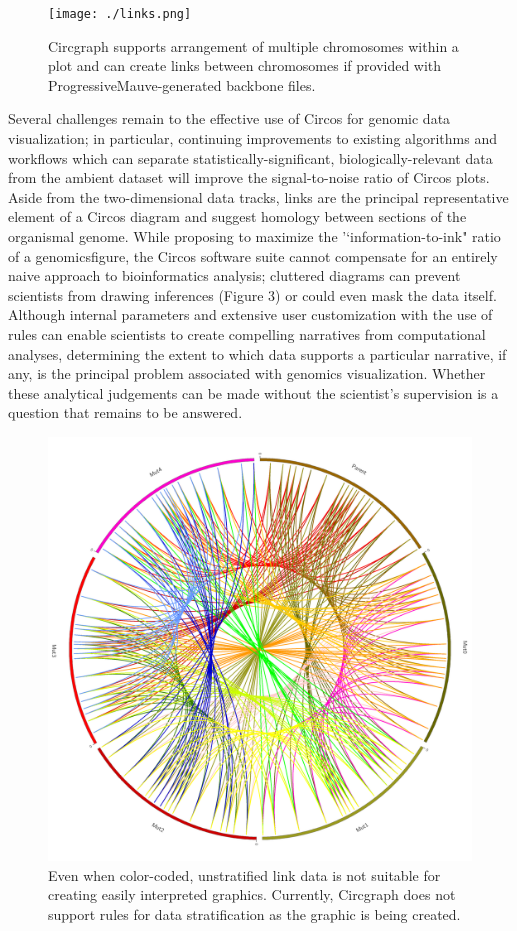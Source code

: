 \documentclass{article}
\begin{document}
\begin{figure}[H]
\centering
\texttt{[image: ./links.png]}
\caption{Circgraph supports arrangement of multiple chromosomes within a plot and can create links between chromosomes if provided with ProgressiveMauve-generated backbone files.}
\end{figure}

Several challenges remain to the effective use of Circos for genomic data visualization; in particular, continuing improvements to existing algorithms and workflows which can separate statistically-significant, biologically-relevant data from the ambient dataset will improve the signal-to-noise ratio of Circos plots. Aside from the two-dimensional data tracks, links are the principal representative element of a Circos diagram and suggest homology between sections of the organismal genome. While proposing to maximize the '`information-to-ink" ratio of a genomicsfigure, the Circos software suite cannot compensate for an entirely naive approach to bioinformatics analysis; cluttered diagrams can prevent scientists from drawing inferences (Figure 3) or could even mask the data itself. Although internal parameters and extensive user customization with the use of rules can enable scientists to create compelling narratives from computational analyses, determining the extent to which data supports a particular narrative, if any, is the principal problem associated with genomics visualization. Whether these analytical judgements can be made without the scientist's supervision is a question that remains to be answered.


\begin{figure}[H]
\centering
\includegraphics[scale=0.1]{./Generated_Data_Non_Ribbon.png}
\caption{Even when color-coded, unstratified link data is not suitable for creating easily interpreted graphics. Currently, Circgraph does not support rules for data stratification as the graphic is being created.}
\end{figure}
\end{document}

